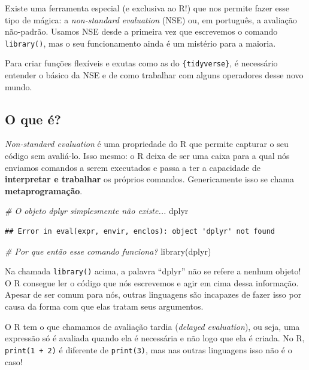 \documentclass[
]{book}
\newenvironment{Shaded}{\begin{snugshade}}{\end{snugshade}}
\newcommand{\CommentTok}[1]{\textcolor[rgb]{0.56,0.35,0.01}{\textit{#1}}}
\newcommand{\FunctionTok}[1]{\textcolor[rgb]{0.00,0.00,0.00}{#1}}
\newcommand{\NormalTok}[1]{#1}
\begin{document}
Existe uma ferramenta especial (e exclusiva ao R!) que nos permite fazer esse tipo de mágica: a \emph{non-standard evaluation} (NSE) ou, em português, a avaliação não-padrão. Usamos NSE desde a primeira vez que escrevemos o comando \texttt{library()}, mas o seu funcionamento ainda é um mistério para a maioria.

Para criar funções flexíveis e exutas como as do \texttt{\{tidyverse\}}, é necessário entender o básico da NSE e de como trabalhar com alguns operadores desse novo mundo.

\hypertarget{o-que-uxe9}{%
\subsection{O que é?}\label{o-que-uxe9}}

\emph{Non-standard evaluation} é uma propriedade do R que permite capturar o seu código sem avaliá-lo. Isso mesmo: o R deixa de ser uma caixa para a qual nós enviamos comandos a serem executados e passa a ter a capacidade de \textbf{interpretar e trabalhar} os próprios comandos. Genericamente isso se chama \textbf{metaprogramação}.

\begin{Shaded}
\begin{Highlighting}[]
\CommentTok{\# O objeto \textquotesingle{}dplyr\textquotesingle{} simplesmente não existe...}
\NormalTok{dplyr}
\end{Highlighting}
\end{Shaded}

\begin{verbatim}
## Error in eval(expr, envir, enclos): object 'dplyr' not found
\end{verbatim}

\begin{Shaded}
\begin{Highlighting}[]
\CommentTok{\# Por que então esse comando funciona?}
\FunctionTok{library}\NormalTok{(dplyr)}
\end{Highlighting}
\end{Shaded}

Na chamada \texttt{library()} acima, a palavra ``dplyr'' não se refere a nenhum objeto! O R consegue ler o código que nós escrevemos e agir em cima dessa informação. Apesar de ser comum para nós, outras linguagens são incapazes de fazer isso por causa da forma com que elas tratam seus argumentos.

O R tem o que chamamos de avaliação tardia (\emph{delayed evaluation}), ou seja, uma expressão só é avaliada quando ela é necessária e não logo que ela é criada. No R, \texttt{print(1\ +\ 2)} é diferente de \texttt{print(3)}, mas nas outras linguagens isso não é o caso!
\end{document}
